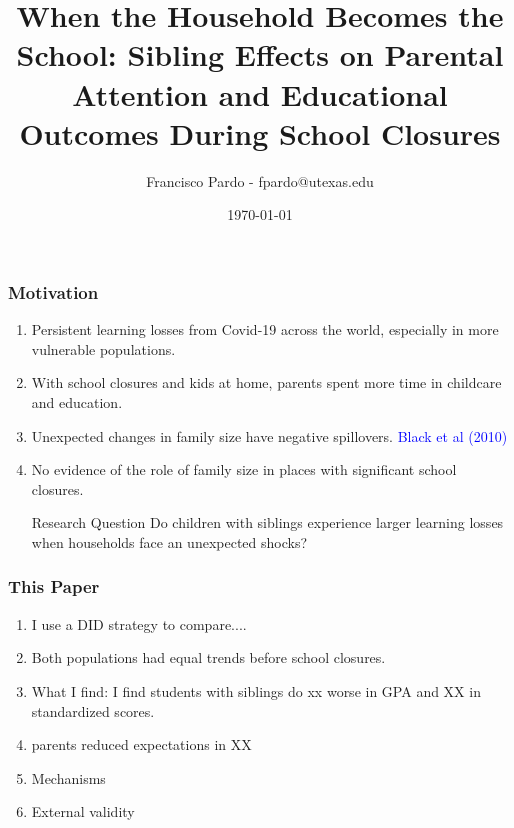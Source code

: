 \documentclass{beamer}
\title[]{When the Household Becomes the School: Sibling Effects on Parental Attention and Educational Outcomes During School Closures}
\author[Francisco Pardo] %
{Francisco Pardo - fpardo@utexas.edu \inst{1}}
\institute[UT] %
{
  \inst{1}%
  University of Texas at Austin
}
\date{\today}
\begin{document}
\frame{\titlepage}


\begin{frame}
    \label{frame:motivation}
    \frametitle{Motivation}

    
    \begin{enumerate}
        \item Persistent learning losses from Covid-19 across the world, especially in more vulnerable populations. %
        \item With school closures and kids at home, parents spent more time in childcare and education.
        \item Unexpected changes in family size have negative spillovers. \textcolor{blue}{Black et al (2010)}
        \item No evidence of the role of family size in places with significant school closures.
        
        \begin{block}{Research Question}
Do children with siblings experience larger learning losses when households face an unexpected shocks?
\end{block}
    \end{enumerate}
\end{frame}

\begin{frame}
    \label{frame:thispaper}
    \frametitle{This Paper}
    \begin{enumerate}
    \item I use a DID strategy to compare.... 
    \item Both populations had equal trends before school closures.
    \item What I find: I find students with siblings do xx worse in GPA and XX in standardized scores. 
    \item parents reduced expectations in XX
    \item Mechanisms
    \item External validity
    \end{enumerate}
\end{frame}
\end{document}
